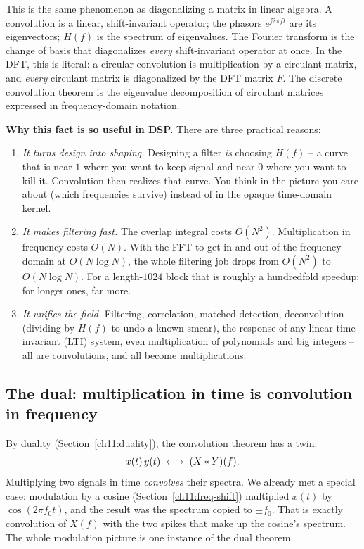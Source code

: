 \begin{connectionbox}
This is the same phenomenon as diagonalizing a matrix in linear algebra. A
convolution is a linear, shift-invariant operator; the phasors $e^{\jj 2\pi f t}$
are its eigenvectors; $H(f)$ is the spectrum of eigenvalues. The Fourier
transform is the change of basis that diagonalizes \emph{every} shift-invariant
operator at once. In the DFT, this is literal: a circular convolution is
multiplication by a circulant matrix, and \emph{every} circulant matrix is
diagonalized by the DFT matrix $F$. The discrete convolution theorem is the eigenvalue
decomposition of circulant matrices expressed in frequency-domain notation.
\end{connectionbox}

\begin{whybox}
\textbf{Why this fact is so useful in DSP.} There are three practical reasons:
\begin{enumerate}
\item \emph{It turns design into shaping.} Designing a filter \emph{is} choosing
$H(f)$ -- a curve that is near $1$ where you want to keep signal and near $0$
where you want to kill it. Convolution then realizes that curve. You think in
the picture you care about (which frequencies survive) instead of in the
opaque time-domain kernel.
\item \emph{It makes filtering fast.} The overlap integral costs $O(N^2)$.
Multiplication in frequency costs $O(N)$. With the FFT to get in and out of the
frequency domain at $O(N\log N)$, the whole filtering job drops from $O(N^2)$ to
$O(N\log N)$. For a length-$1024$ block that is roughly a hundredfold speedup;
for longer ones, far more.
\item \emph{It unifies the field.} Filtering, correlation, matched detection,
deconvolution (dividing by $H(f)$ to undo a known smear), the response of any linear time-invariant (LTI)
system, even multiplication of polynomials and big integers -- all are
convolutions, and all become multiplications.
\end{enumerate}
\end{whybox}

\subsection{The dual: multiplication in time is convolution in frequency}

By duality (Section~\ref{ch11:duality}), the convolution theorem has a twin:
\[
x(t)\,y(t) \;\longleftrightarrow\; (X \ast Y)(f).
\]
Multiplying two signals in time \emph{convolves} their spectra. We already met a
special case: modulation by a cosine (Section~\ref{ch11:freq-shift}) multiplied
$x(t)$ by $\cos(2\pi f_0 t)$, and the result was the spectrum copied to $\pm
f_0$. That is exactly convolution of $X(f)$ with the two spikes that make up the
cosine's spectrum. The whole modulation picture is one instance of the dual
theorem.

